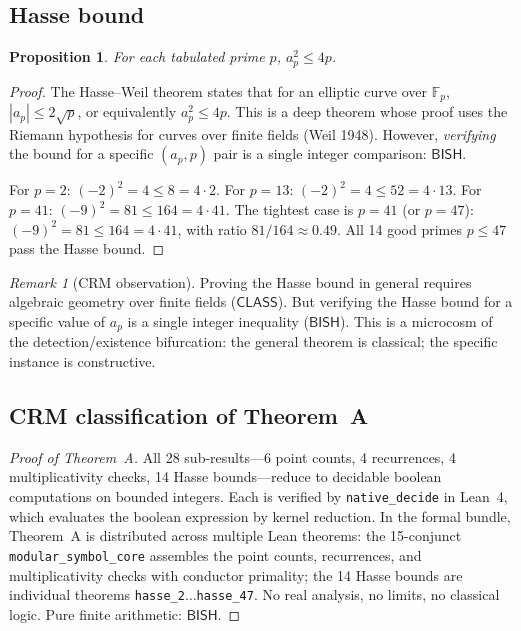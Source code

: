 \documentclass[11pt]{article}
\theoremstyle{plain}
\newtheorem{proposition}[theorem]{Proposition}
\theoremstyle{definition}
\theoremstyle{remark}
\newtheorem{remark}[theorem]{Remark}
\newcommand{\F}{\mathbb{F}}
\newcommand{\BISH}{\ensuremath{\mathsf{BISH}}}
\newcommand{\CLASS}{\ensuremath{\mathsf{CLASS}}}
\begin{document}
\subsection{Hasse bound}

\begin{proposition}\label{prop:hasse}
For each tabulated prime $p$, $a_p^2 \leq 4p$.
\end{proposition}

\begin{proof}
The Hasse--Weil theorem states that for an elliptic curve over $\F_p$, $|a_p| \leq 2\sqrt{p}$, or equivalently $a_p^2 \leq 4p$. This is a deep theorem whose proof uses the Riemann hypothesis for curves over finite fields (Weil 1948). However, \emph{verifying} the bound for a specific $(a_p, p)$ pair is a single integer comparison: $\BISH$.

For $p = 2$: $(-2)^2 = 4 \leq 8 = 4 \cdot 2$. For $p = 13$: $(-2)^2 = 4 \leq 52 = 4 \cdot 13$. For $p = 41$: $(-9)^2 = 81 \leq 164 = 4 \cdot 41$. The tightest case is $p = 41$ (or $p = 47$): $(-9)^2 = 81 \leq 164 = 4 \cdot 41$, with ratio $81/164 \approx 0.49$. All 14 good primes $p \leq 47$ pass the Hasse bound.
\end{proof}

\begin{remark}[CRM observation]
Proving the Hasse bound in general requires algebraic geometry over finite fields ($\CLASS$). But verifying the Hasse bound for a specific value of $a_p$ is a single integer inequality ($\BISH$). This is a microcosm of the detection/existence bifurcation: the general theorem is classical; the specific instance is constructive.
\end{remark}

\subsection{CRM classification of Theorem~A}

\begin{proof}[Proof of Theorem~A]
All 28 sub-results---6 point counts, 4 recurrences, 4 multiplicativity checks, 14 Hasse bounds---reduce to decidable boolean computations on bounded integers. Each is verified by \texttt{native\_decide} in Lean~4, which evaluates the boolean expression by kernel reduction. In the formal bundle, Theorem~A is distributed across multiple Lean theorems: the 15-conjunct \texttt{modular\_symbol\_core} assembles the point counts, recurrences, and multiplicativity checks with conductor primality; the 14 Hasse bounds are individual theorems \texttt{hasse\_2}$\ldots$\texttt{hasse\_47}. No real analysis, no limits, no classical logic. Pure finite arithmetic: $\BISH$.
\end{proof}
\end{document}
